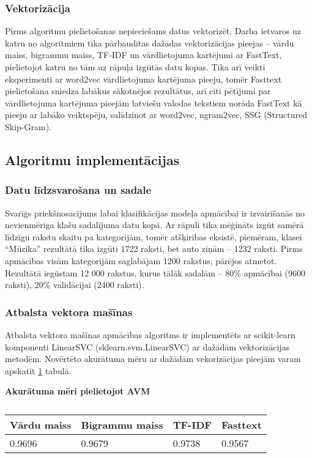 \subsubsection{Vektorizācija}
Pirms algoritmu pielietošanas nepieciešams datus vektorizēt. Darba ietvaros uz katru no algoritmiem tika pārbaudītas dažādas vektorizācijas pieejas – vārdu maiss, bigrammu maiss, TF-IDF un vārdlietojuma kartējumi ar FastText, pielietojot katru no tām uz rāpuļa izgūtās datu kopas. Tika arī veikti eksperimenti ar word2vec vārdlietojuma kartējuma pieeju, tomēr Fasttext pielietošana sniedza labākus sākotnējos rezultātus, arī citi pētījumi par vārdlietojuma kartējuma pieejām latviešu valodas tekstiem \cite{LaucisJekabsonWordEmbedding} norāda FastText kā pieeju ar labāko veiktspēju, salīdzinot ar word2vec, ngram2vec, SSG (Structured Skip-Gram).

\subsection{Algoritmu implementācijas}

\subsubsection{Datu līdzsvarošana un sadale}
Svarīģs priekšnosacījums labai klasifikācijas modeļa apmācībai ir izvairīšanās no nevienmērīga klašu sadalījuma datu kopā. Ar rāpuli tika mēģināts izgūt samērā līdzīgu rakstu skaitu pa kategorijām, tomēr atšķirības eksistē, piemēram, klasei “Mūzika” rezultātā tika izgūti 1722 raksti, bet auto ziņām – 1232 raksti. Pirms apmācības visām kategorijām saglabājam 1200 rakstus, pārējos atmetot. Rezultātā iegūstam 12 000 rakstus, kurus tālāk sadalām – 80\% apmācībai (9600 raksti), 20\% validācijai (2400 raksti).

\subsubsection{Atbalsta vektora mašīnas}
Atbalsta vektora mašīnas apmācības algoritms ir implementēts ar scikit-learn komponenti LinearSVC (sklearn.svm.LinearSVC) ar dažādām vektorizācijas metodēm. Novērtēto akurātuma mēru ar dažādām vekorizācijas pieejām varam apskatīt \ref{tab:accuracy_svm} tabulā.
\begin{table}[H]
\centering
\caption{\label{tab:accuracy_svm}}
\textbf{Akurātuma mēri pielietojot AVM\\}
\begin{tabular}{|l|l|l|l|}
\hline
Vārdu maiss & Bigrammu maiss & TF-IDF & Fasttext \\ \hline
0.9696 & 0.9679 & 0.9738 & 0.9567 \\ \hline
\end{tabular}
\end{table}

